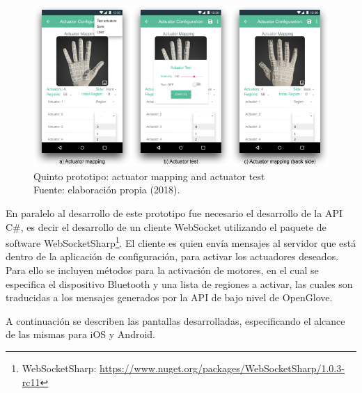 \begin{figure}[H]
	\centering
	\captionsetup{justification=centering}
   	\includegraphics[width=1.0\textwidth]{images/chapter03/05-prototype/05-prototype.png} 
            \caption[Quinto prototipo: actuator mapping and  actuator test]{Quinto prototipo: actuator mapping and actuator test \\ Fuente: elaboración propia (2018).}
    \label{fig:prototype-05}
\end{figure}

En paralelo al desarrollo de este prototipo fue necesario el desarrollo de la API C\#, es decir el desarrollo de un cliente WebSocket utilizando el paquete de software WebSocketSharp\footnote{WebSocketSharp: \url{https://www.nuget.org/packages/WebSocketSharp/1.0.3-rc11}}. El cliente es quien envía mensajes al servidor que está dentro de la aplicación de configuración, para activar los actuadores deseados. Para ello se incluyen métodos para la activación de motores, en el cual se especifica el dispositivo Bluetooth y una lista de regiones a activar, las cuales son traducidas a los mensajes generados por la API de bajo nivel de OpenGlove.

A continuación se describen las pantallas desarrolladas, especificando el alcance de las mismas para iOS y Android.

